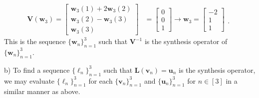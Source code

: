 \documentclass[12pt]{amsart}
\newcommand{\1}{\mathbbm{1}}
\numberwithin{equation}{section}
\numberwithin{Theorem}{section}
\theoremstyle{plain} %
\theoremstyle{definition}
\theoremstyle{remark}
\begin{document}
\begin{enumerate}[1.]
\begin{align*}
	\mathbf{V}(\mathbf{w}_3) =
	\begin{bmatrix}
		\mathbf{w}_3(1) + 2\mathbf{w}_3(2) \\
		\mathbf{w}_3(2) -  \mathbf{w}_3(3) \\
		\mathbf{w}_3(3)
	\end{bmatrix}
	&= 
	\begin{bmatrix} 0 \\ 0 \\ 1 \end{bmatrix}
	\rightarrow
	\mathbf{w}_3 =
	\begin{bmatrix} -2 \\ 1 \\ 1 \end{bmatrix}
	\begin{matrix} \\ \\ . \end{matrix}
\end{align*}
This is the sequence \(\{\mathbf{w}_{n}\}_{n=1}^{3}\) such that \(\mathbf{V}^{-1}\) is the synthesis operator of \(\{\mathbf{w}_{n}\}_{n=1}^{3}\).


\clearpage
b)
To find a sequence 
\(\{\boldsymbol{\ell}_{n}\}_{n=1}^{3}\) such that 
\(\mathbf{L}(\mathbf{v}_{n}) = \mathbf{u}_{n}\) is the synthesis operator,
we may evaluate 
\(\{\boldsymbol{\ell}_{n}\}_{n=1}^{3}\)
for each 
\(\{\mathbf{v}_{n}\}_{n=1}^{3}\) and
\(\{\mathbf{u}_{n}\}_{n=1}^{3}\) for $n\in[3]$
in a similar manner as above.


\end{enumerate}
\end{document}
